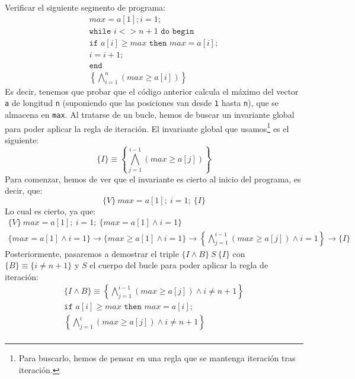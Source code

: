 \begin{ejercicio}\label{ej_rel1_44}
    Verificar el siguiente segmento de programa:
    \begin{gather*}
        max = a[1]; i = 1; \\
        \texttt{while\ } i <> n+1 \texttt{\ do\ begin} \\
        \texttt{if\ } a[i] \geq max \texttt{\ then\ } max = a[i];\\
        i=i+1; \\
        \texttt{end} \\
        \left\{\bigwedge_{i=1}^n (max \geq a[i])\right\}
    \end{gather*}
    Es decir, tenemos que probar que el código anterior calcula el máximo del vector \verb|a| de longitud \verb|n| (suponiendo que las posiciones van desde \verb|1| hasta \verb|n|), que se almacena en \verb|max|. Al tratarse de un bucle, hemos de buscar un invariante global para poder aplicar la regla de iteración. El invariante global que usamos\footnote{Para buscarlo, hemos de pensar en una regla que se mantenga iteración tras iteración.} es el siguiente:
    \begin{equation*}
        \{I\} \equiv \left\{\bigwedge_{j=1}^{i-1} (max \geq a[j])\right\}
    \end{equation*}
    Para comenzar, hemos de ver que el invariante es cierto al inicio del programa, es decir, que:
    \begin{equation*}
        \{V\}\ max = a[1];\ i=1;\ \{I\}
    \end{equation*}
    Lo cual es cierto, ya que:
    \begin{gather*}
        \{V\}\ max=a[1];\ i=1;\ \{max = a[1] \land i = 1\} \\ 
        \{max = a[1] \land i = 1\}\rightarrow \{max \geq a[1] \land i=1\} \rightarrow \left\{\bigwedge_{j=1}^{i-1} (max \geq a[j]) \land i = 1\right\} \rightarrow \{I\}
    \end{gather*}
    Posteriormente, pasaremos a demostrar el triple $\{I \land B\}\ S\ \{I\}$ con $\{B\} \equiv \{i\neq n+1\}$ y $S$ el cuerpo del bucle para poder aplicar la regla de iteración:
    \begin{gather*}
        \{I \land B\} \equiv \left\{\bigwedge_{j=1}^{i-1} (max \geq a[j]) \land i\neq n+1\right\} \\
        \texttt{if\ } a[i] \geq max \texttt{\ then\ } max = a[i];\\
        \left\{\bigwedge_{j=1}^{i} (max \geq a[j]) \land i\neq n+1\right\} \\

\end{gather*}
\end{ejercicio}
